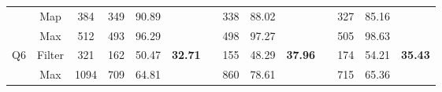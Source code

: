 \begin{table}
\begin{tabular}{cccccccccccccc}
                                & Map                                 & 384                             & 349                                                                     & 90.89                                                                      &                                 &           & 338                                                                     & 88.02                                                                      &                                 &           & 327                                                                     & 85.16                                                                      &                                 \\
                                & Max                                 & 512                             & 493                                                                     & 96.29                                                                      &                                 &           & 498                                                                     & 97.27                                                                      &                                 &           & 505                                                                     & 98.63                                                                      &                                 \\ \hline
\multirow{2}{*}{Q6}             & Filter                              & 321                             & 162                                                                     & 50.47                                                                      & \multirow{2}{*}{\textbf{32.71}} &           & 155                                                                     & 48.29                                                                      & \multirow{2}{*}{\textbf{37.96}} &           & 174                                                                     & 54.21                                                                      & \multirow{2}{*}{\textbf{35.43}} \\
                                & Max                                 & 1094                            & 709                                                                     & 64.81                                                                      &                                 &           & 860                                                                     & 78.61                                                                      &                                 &           & 715                                                                     & 65.36                                                                      &                                 \\ \hline
\end{tabular}
\end{table}

